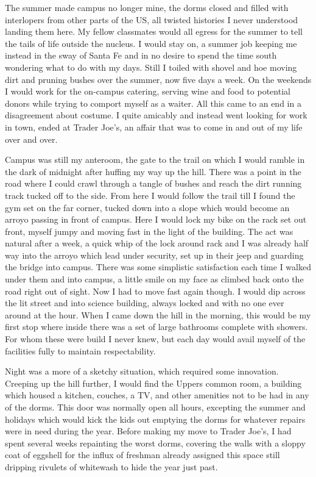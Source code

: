 \documentclass[ebook, 10pt, openright, onecolumn]{memoir}
\newcommand*\td[1]{
  \todo[inline]{
     #1 
  }
}
\newcommand*\finish{\td{ ----- Finish this section -----}}
\begin{document}
The summer made campus no longer mine, the dorms closed and filled with
interlopers from other parts of the US, all twisted histories I never understood
landing them here.  My fellow classmates would all egress for the summer to tell
the tails of life outside the nucleus.  I would stay on, a summer job
keeping me instead in the sway of Santa Fe and in no desire to spend the time
south wondering what to do with my days.  Still I toiled with shovel and hoe
moving dirt and pruning bushes over the summer, now five days a week.  On the
weekends I would work for the on-campus catering, serving wine and food to
potential donors while trying to comport myself as a waiter.  All this came to
an end in a disagreement about costume.  I quite amicably and instead went
looking for work in town, ended at Trader Joe's, an affair that was to come in
and out of my life over and over.

\finish{}


Campus was still my anteroom, the gate to the trail on which I would ramble in
the dark of midnight after huffing my way up the hill.  There was a point in the
road where I could crawl through a tangle of bushes and reach the dirt running
track tucked off to the side.  From here I would follow the trail till I found
the gym set on the far corner, tucked down into a slope which would become an
arroyo passing in front of campus.  Here I would lock my bike on the rack set
out front, myself jumpy and moving fast in the light of the building.  The act
was natural after a week, a quick whip of the lock around rack and I was already
half way into the arroyo which lead under security, set up in their jeep and
guarding the bridge into campus.  There was some simplistic satisfaction each
time I walked under them and into campus, a little smile on my face as climbed
back onto the road right out of sight.  Now I had to move fast again though.  I
would dip across the lit street and into science building, always locked and
with no one ever around at the hour.  When I came down the hill in the morning,
this would be my first stop where inside there was a set of large bathrooms
complete with showers.  For whom these were build I never knew, but each day
would avail myself of the facilities fully to maintain respectability.

Night was a more of a sketchy situation, which required some innovation.
Creeping up the hill further, I would find the Uppers common room, a building
which housed a kitchen, couches, a TV, and other amenities not to be had in any
of the dorms.  This door was normally open all hours, excepting the summer and
holidays which would kick the kids out emptying the dorms for whatever repairs
were in need during the year.  Before making my move to Trader Joe's, I had
spent several weeks repainting the worst dorms, covering the walls with a sloppy
coat of eggshell for the influx of freshman already assigned this space still
dripping rivulets of whitewash to hide the year just past.
\end{document}
